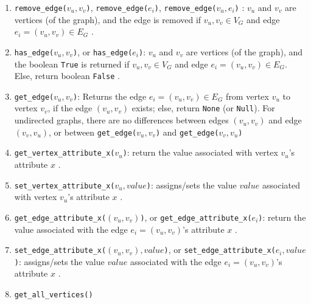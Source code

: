 \begin{enumerate}
\begin{enumerate}
	\item {\tt remove\_edge($v_{u}, v_{v}$)}, {\tt remove\_edge($e_{i}$)}, {\tt remove\_edge($v_{u}, e_{i}$)} \cite[\S55.3.4, pp. 909]{Goldman2008}: $v_{u}$ and $v_{v}$ are vertices (of the graph), and the edge is removed if $v_{u}, v_{v} \in V_{G}$ and edge $e_{i} = (v_{u}, v_{v}) \in E_{G}$ \cite{WikipediaContributors2018a49} \cite[\S14.1.1, pp. 626]{Goodrich2013} \cite[\S13.1.1, pp. 599]{Goodrich2011} \cite[\S52.4, pp. 849]{Goldman2008}.
	\item {\tt has\_edge($v_{u}, v_{v}$)}, or {\tt has\_edge($e_{i}$)}: $v_{u}$ and $v_{v}$ are vertices (of the graph), and the boolean {\tt True} is returned if $v_{u}, v_{v} \in V_{G}$ and edge $e_{i} = (v_{u}, v_{v}) \in E_{G}$. Else, return boolean {\tt False} \cite[\S52.4, pp. 849; \S52.5, pp. 850]{Goldman2008}.
	\item {\tt get\_edge($v_{u}, v_{v}$)}: Returns the edge $e_{i} = (v_{u}, v_{v}) \in E_{G}$ from vertex $v_{u}$ to vertex $v_{v}$, if the edge $(v_{u}, v_{v})$ exists; else, return {\tt None} (or {\tt Null}). For undirected graphs, there are no differences between edges $(v_{u}, v_{v})$ and edge $(v_{v}, v_{u})$, or between {\tt get\_edge($v_{u}, v_{v}$)} and {\tt get\_edge($v_{v}, v_{u}$)} \cite[\S14.1.1, pp. 626]{Goodrich2013} \cite[\S52.4, pp. 849; \S52.5, pp. 851]{Goldman2008}
	\item {\tt get\_vertex\_attribute\_x($v_{u}$)}: return the value associated with vertex $v_{u}$'s attribute $x$ \cite{WikipediaContributors2018a49}.
	\item {\tt set\_vertex\_attribute\_x($v_{u}, value$)}: assigns/sets the value $value$ associated with vertex $v_{u}$'s attribute $x$ \cite{WikipediaContributors2018a49}.
	\item {\tt get\_edge\_attribute\_x($(v_{u}, v_{v})$)}, or {\tt get\_edge\_attribute\_x($e_{i}$)}: return the value associated with the edge $e_{i} = (v_{u}, v_{v})$'s attribute $x$ \cite{WikipediaContributors2018a49}.
	\item {\tt set\_edge\_attribute\_x($(v_{u}, v_{v}), value$)}, or {\tt set\_edge\_attribute\_x($e_{i}, value$)}: assigns/sets the value $value$ associated with the edge $e_{i} = (v_{u}, v_{v})$'s attribute $x$ \cite{WikipediaContributors2018a49}.
	\item {\tt get\_all\_vertices()} \cite[\S13.1.1, pp. 599]{Goodrich2011}

\end{enumerate}
\end{enumerate}
